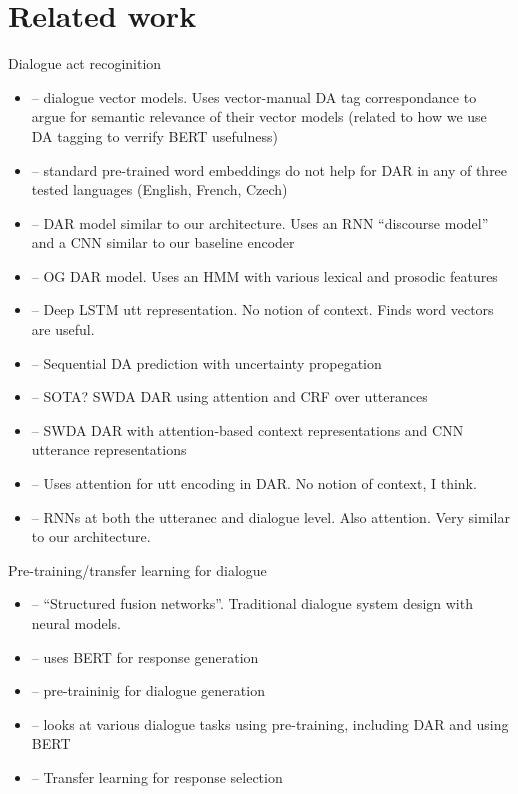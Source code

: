 \documentclass[11pt,a4paper]{article}
\begin{document}
\section{Related work} %
Dialogue act recoginition
\begin{itemize}
  \item \citet{pragstVectorRepresentationUtterances2018} -- dialogue vector models. Uses vector-manual DA tag correspondance to argue for semantic relevance of their vector models (related to how we use DA tagging to verrify BERT usefulness)
  \item \citet{cerisaraEffectsUsingWord2vec2017} -- standard pre-trained word embeddings do not help for DAR in any of three tested languages (English, French, Czech)
  \item \citet{kalchbrennerRecurrentConvolutionalNeural2013} -- DAR model similar to our architecture. Uses an RNN ``discourse model'' and a CNN similar to our baseline encoder
  \item \citet{stolckeDialogueActModeling2000} -- OG DAR model. Uses an HMM with various lexical and prosodic features
  \item \citet{khanpourDialogueActClassification2016} -- Deep LSTM utt representation. No notion of context. Finds word vectors are useful.
  \item \citet{tranPreservingDistributionalInformation2017} -- Sequential DA prediction with uncertainty propegation
  \item \citet{chenDialogueActRecognition2017} -- SOTA? SWDA DAR using attention and CRF over utterances
  \item \citet{ortegaNeuralbasedContextRepresentation2017} -- SWDA DAR with attention-based context representations and CNN utterance representations
  \item \citet{shenNeuralAttentionModels2016} -- Uses attention for utt encoding in DAR. No notion of context, I think.
  \item \citet{tranHierarchicalNeuralModel2017} -- RNNs at both the utteranec and dialogue level. Also attention. Very similar to our architecture.
\end{itemize}

Pre-training/transfer learning for dialogue
\begin{itemize}
  \item \citet{mehriStructuredFusionNetworks2019} -- ``Structured fusion networks''. Traditional dialogue system design with neural models.
  \item \citet{chenSemanticallyConditionedDialog2019a} -- uses BERT for response generation
  \item \citet{baoPLATOPretrainedDialogue2019} -- pre-traininig for dialogue generation
  \item \citet{mehriPretrainingMethodsDialog2019} -- looks at various dialogue tasks using pre-training, including DAR and using BERT
  \item \citet{vigComparisonTransferLearningApproaches} -- Transfer learning for response selection
\end{itemize}
\end{document}
